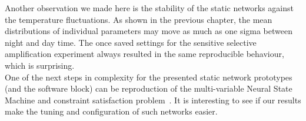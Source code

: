 Another observation we made here is the stability of the static networks against the temperature fluctuations. As shown in the previous chapter, the mean distributions of individual parameters may move as much as one sigma between night and day time. The once saved settings for the sensitive selective amplification experiment always resulted in the same reproducible behaviour, which is surprising.\\

One of the next steps in complexity for the presented static network prototypes (and the software block) can be reproduction of the multi-variable Neural State Machine and constraint satisfaction problem~\cite{Neftci_etal12a}. It is interesting to see if our results make the tuning and configuration of such networks easier.



